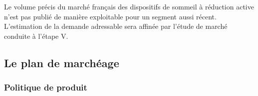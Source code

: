 \begin{hypothese}
Le volume précis du marché français des dispositifs de sommeil à réduction
active n'est pas publié de manière exploitable pour un segment aussi récent.
L'estimation de la demande adressable sera affinée par l'étude de marché
conduite à l'étape V.
\end{hypothese}

\clearpage
\subsection{Le plan de marchéage}

\subsubsection{Politique de produit}

